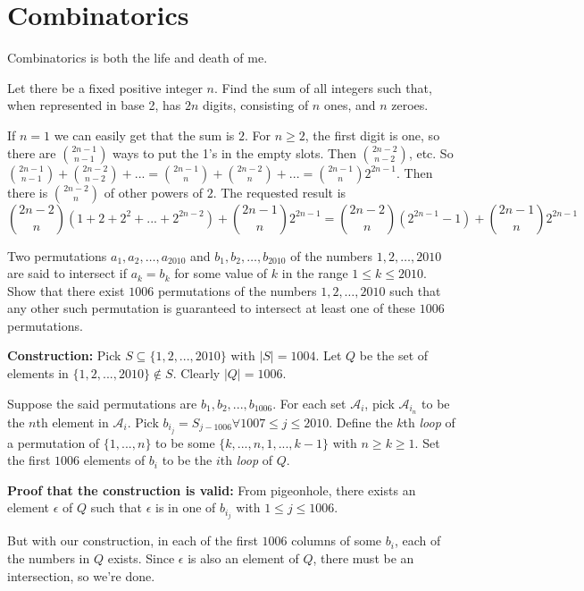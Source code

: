\documentclass[11pt]{scrartcl}
\begin{document}
\section{Combinatorics}
Combinatorics is both the life and death of me.
\begin{example}
  [Canada]
  Let there be a fixed positive integer $n$. Find the sum of all integers such that, when represented in base 2, has $2n$ digits, consisting of $n$ ones,
  and $n$ zeroes.
\end{example}
\begin{soln}
  If $n=1$ we can easily get that the sum is $2$.
  For $n\ge 2$, the first digit is one, so there are $\binom{2n-1}{n-1}$ ways to put the 1's in the empty slots. Then $\binom{2n-2}{n-2}$, etc.
  So $\binom{2n-1}{n-1}+\binom{2n-2}{n-2}+...=\binom{2n-1}{n}+\binom{2n-2}{n}+...=\binom{2n-1}{n}2^{2n-1}$. Then there is $\binom{2n-2}{n}$ of other powers of $2$.
  The requested result is
  $$\binom{2n-2}{n}(1+2+2^2+...+2^{2n-2})+\binom{2n-1}{n}2^{2n-1}=\boxed{\binom{2n-2}{n}(2^{2n-1}-1)+\binom{2n-1}{n}2^{2n-1}}$$
\end{soln}
\begin{example}
  [USAJMO 2010]
  Two permutations $a_1,a_2,\dots,a_{2010}$ and $b_1,b_2,\dots,b_{2010}$ of the numbers $1,2,\dots,2010$ are said to intersect if $a_k=b_k$ for some value of $k$ in the range $1\le k\le 2010$. Show that there exist $1006$ permutations of the numbers $1,2,\dots,2010$ such that any other such permutation is guaranteed to intersect at least one of these $1006$ permutations.
\end{example}
\begin{soln}
  \textbf{Construction:} Pick $S\subseteq \{1,2,...,2010\}$ with $|S|=1004$. Let $Q$ be the set of elements in $\{1,2,...,2010\}\notin S$. Clearly $|Q|=1006$.

  Suppose the said permutations are $b_1, b_2,..., b_{1006}$. For each set $\mathcal{A}_i$, pick $\mathcal{A}_{i_n}$ to be the $n$th element in $\mathcal{A}_i$.
  Pick $b_{i_j}=S_{j-1006}\forall 1007\le j\le 2010$. Define the $k$th \textit{loop} of a permutation of $\{1,...,n\}$ to be some $\{k,...,n,1,...,k-1\}$
  with $n\ge k\ge 1$. Set the first $1006$ elements of $b_i$ to be the $i$th \textit{loop} of $Q$.

  \textbf{Proof that the construction is valid:} From pigeonhole, there exists an element $\epsilon$ of $Q$ such that $\epsilon$ is in one of
  $b_{i_j}$ with $1\le j\le 1006$.

  But with our construction, in each of the first $1006$ columns of some $b_i$, each of the numbers in $Q$ exists. Since $\epsilon$ is also an element of $Q$,
  there must be an intersection, so we're done.
\end{soln}
\end{document}
